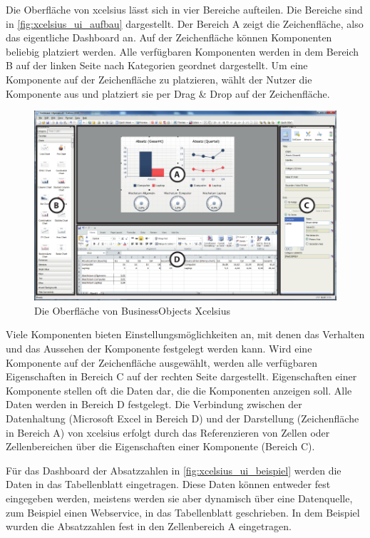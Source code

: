 \begin{onehalfspacing}
Die Oberfläche von \gls{xcelsius} lässt sich in vier Bereiche aufteilen. Die Bereiche sind in \vref{fig:xcelsius_ui_aufbau} dargestellt. Der Bereich A zeigt die Zeichenfläche, also das eigentliche Dashboard an. Auf der Zeichenfläche können Komponenten beliebig platziert werden. Alle verfügbaren Komponenten werden in dem Bereich B auf der linken Seite nach Kategorien geordnet dargestellt. Um eine Komponente auf der Zeichenfläche zu platzieren, wählt der Nutzer die Komponente aus und platziert sie per Drag \& Drop auf der Zeichenfläche. 

\begin{figure}[ht]
\centering
\setlength{\unitlength}{1mm}
\includegraphics[width=15cm]{images/Abbildung5-Xcelsius-Oberflaeche-AI.pdf}
\caption{Die Oberfläche von BusinessObjects Xcelsius\label{fig:xcelsius_ui_aufbau}}
\end{figure}

Viele Komponenten bieten Einstellungsmöglichkeiten an, mit denen das Verhalten und das Aussehen der Komponente festgelegt werden kann. Wird eine Komponente auf der Zeichenfläche ausgewählt, werden alle verfügbaren Eigenschaften in Bereich C auf der rechten Seite dargestellt. Eigenschaften einer Komponente stellen oft die Daten dar, die die Komponenten anzeigen soll. Alle Daten werden in Bereich D festgelegt. Die Verbindung zwischen der Datenhaltung (Microsoft Excel in Bereich D) und der Darstellung (Zeichenfläche in Bereich A) von \gls{xcelsius} erfolgt durch das Referenzieren von Zellen oder Zellenbereichen über die Eigenschaften einer Komponente (Bereich C).

Für das Dashboard der Absatzzahlen in \vref{fig:xcelsius_ui_beispiel} werden die Daten in das Tabellenblatt eingetragen. Diese Daten können entweder fest eingegeben werden, meistens werden sie aber dynamisch über eine Datenquelle, zum Beispiel einen Webservice, in das Tabellenblatt geschrieben. In dem Beispiel wurden die Absatzzahlen fest in den Zellenbereich A eingetragen. 


\end{onehalfspacing}
